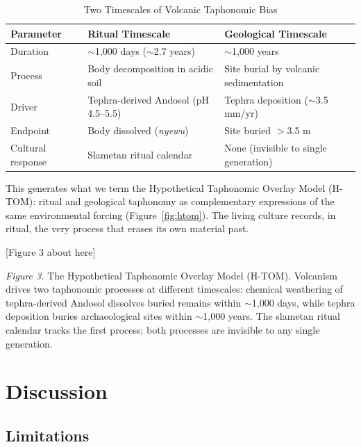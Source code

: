 \documentclass[12pt,a4paper]{article}
\begin{document}
\begin{table}[H]
\centering
\caption{Two Timescales of Volcanic Taphonomic Bias}
\label{tab:timescales}
\begin{tabularx}{\textwidth}{@{}lXX@{}}
\toprule
\textbf{Parameter} & \textbf{Ritual Timescale} & \textbf{Geological Timescale} \\
\midrule
Duration & $\sim$1,000 days ($\sim$2.7 years) & $\sim$1,000 years \\
Process & Body decomposition in acidic soil & Site burial by volcanic sedimentation \\
Driver & Tephra-derived Andosol (pH 4.5--5.5) & Tephra deposition ($\sim$3.5 mm/yr) \\
Endpoint & Body dissolved (\textit{nyewu}) & Site buried $>$3.5 m \\
Cultural response & Slametan ritual calendar & None (invisible to single generation) \\
\bottomrule
\end{tabularx}
\end{table}

This generates what we term the Hypothetical Taphonomic Overlay Model (H-TOM): ritual and geological taphonomy as complementary expressions of the same environmental forcing (Figure~\ref{fig:htom}). The living culture records, in ritual, the very process that erases its own material past.

[Figure 3 about here]

\noindent\textit{Figure 3.} The Hypothetical Taphonomic Overlay Model (H-TOM). Volcanism drives two taphonomic processes at different timescales: chemical weathering of tephra-derived Andosol dissolves buried remains within $\sim$1,000 days, while tephra deposition buries archaeological sites within $\sim$1,000 years. The slametan ritual calendar tracks the first process; both processes are invisible to any single generation.
\label{fig:htom}


\section{Discussion}

\subsection{Limitations}
\end{document}
